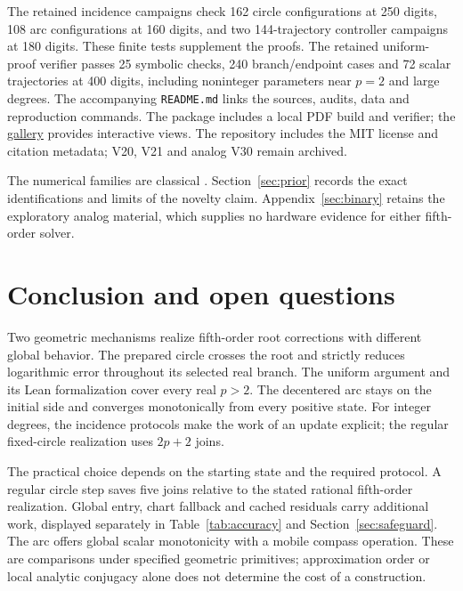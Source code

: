 \documentclass[11pt,a4paper]{article}
\begin{document}
The retained incidence campaigns check 162 circle configurations at 250 digits, 108 arc configurations at 160 digits, and two 144-trajectory controller campaigns at 180 digits. These finite tests supplement the proofs. The retained uniform-proof verifier passes 25 symbolic checks, 240 branch/endpoint cases and 72 scalar trajectories at 400 digits, including noninteger parameters near $p=2$ and large degrees. The accompanying \texttt{README.md} links the sources, audits, data and reproduction commands. The package includes a local PDF build and verifier; the \href{https://ivan-fr.github.io/pandrosion/}{gallery} provides interactive views. The repository includes the MIT license and citation metadata; V20, V21 and analog V30 remain archived.

The numerical families are classical \cite{dlmf38,laszkiewicz2009,baker1996}. Section~\ref{sec:prior} records the exact identifications and limits of the novelty claim. Appendix~\ref{sec:binary} retains the exploratory analog material, which supplies no hardware evidence for either fifth-order solver.

\clearpage
\section{Conclusion and open questions}
Two geometric mechanisms realize fifth-order root corrections with different global behavior. The prepared circle crosses the root and strictly reduces logarithmic error throughout its selected real branch. The uniform argument and its Lean formalization cover every real $p>2$. The decentered arc stays on the initial side and converges monotonically from every positive state. For integer degrees, the incidence protocols make the work of an update explicit; the regular fixed-circle realization uses $2p+2$ joins.

The practical choice depends on the starting state and the required protocol. A regular circle step saves five joins relative to the stated rational fifth-order realization. Global entry, chart fallback and cached residuals carry additional work, displayed separately in Table~\ref{tab:accuracy} and Section~\ref{sec:safeguard}. The arc offers global scalar monotonicity with a mobile compass operation. These are comparisons under specified geometric primitives; approximation order or local analytic conjugacy alone does not determine the cost of a construction.
\end{document}
